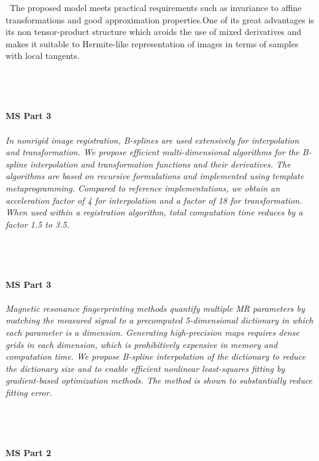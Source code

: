 \begin{multicols}{2}
{\
The proposed model meets practical requirements such as invariance to affine transformations and good approximation properties.One of its great advantages is its non tensor-product structure which avoids the use of mixed derivatives and makes it suitable to Hermite-like representation of images in terms of samples with local tangents.}\\
\\ 
    \\
    \\\\
    \noindent\textbf{MS Part 3}\\
\\  
    \textit{In nonrigid image registration, B-splines are used extensively for interpolation and transformation. We propose efficient multi-dimensional algorithms for the B-spline interpolation and transformation functions and their derivatives. The algorithms are based on recursive formulations and implemented using template metaprogramming. Compared to reference implementations, we obtain an acceleration factor of 4 for interpolation and a factor of 18 for transformation. When used within a registration algorithm, total computation time reduces by a factor 1.5 to 3.5.}\\
\\ 
    \\
    \\\\
    \noindent\textbf{MS Part 3}\\
\\  
    \textit{Magnetic resonance fingerprinting methods quantify multiple MR parameters by matching the measured signal to a precomputed 5-dimensional dictionary in which each parameter is a dimension. Generating high-precision maps requires dense grids in each dimension, which is prohibitively expensive in memory and computation time. We propose B-spline interpolation of the dictionary to reduce the dictionary size and to enable efficient nonlinear least-squares fitting by gradient-based optimization methods. The method is shown to substantially reduce fitting error.}\\
\\ 
    \\
    \\\\
    \noindent\textbf{MS Part 2}\\

\end{multicols}
